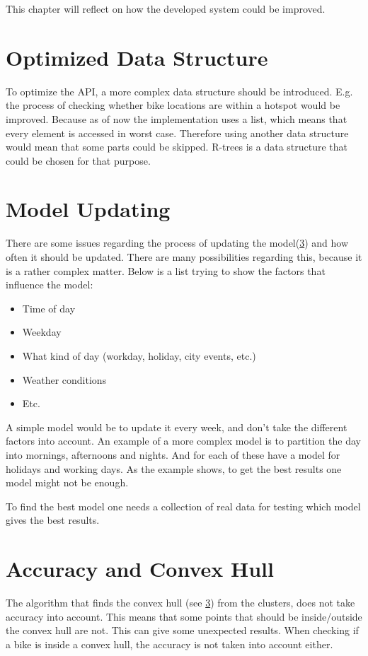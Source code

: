This chapter will reflect on how the developed system could be improved.

\section{Optimized Data Structure}
To optimize the API, a more complex data structure should be introduced.
E.g. the process of checking whether bike locations are within a hotspot would be improved.
Because as of now the implementation uses a list, which means that every element is accessed in worst case.
Therefore using another data structure would mean that some parts could be skipped.
R-trees\cite[Section 25.3.5.3]{database_system_concepts} is a data structure that could be chosen for that purpose.

\section{Model Updating}\label{reflection:model_updating}
There are some issues regarding the process of updating the model(\cref{}) and how often it should be updated.
There are many possibilities regarding this, because it is a rather complex matter.
Below is a list trying to show the factors that influence the model:
\begin{itemize}
\item Time of day
\item Weekday
\item What kind of day (workday, holiday, city events, etc.)
\item Weather conditions
\item Etc.
\end{itemize}
A simple model would be to update it every week, and don't take the different factors into account.
An example of a more complex model is to partition the day into mornings, afternoons and nights.
And for each of these have a model for holidays and working days.
As the example shows, to get the best results one model might not be enough. 

To find the best model one needs a collection of real data for testing which model gives the best results.


\section{Accuracy and Convex Hull}
The algorithm that finds the convex hull (see  \cref{}) from the clusters, does not take accuracy into account.
This means that some points that should be inside/outside the convex hull are not.
This can give some unexpected results.
When checking if a bike is inside a convex hull, the accuracy is not taken into account either.

